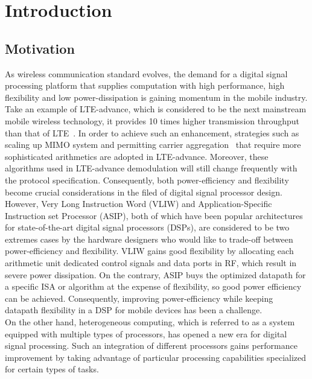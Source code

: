 \chapter{Introduction}

    \section{Motivation}
        As wireless communication standard evolves, the demand for a digital signal processing platform that supplies computation with high performance, high flexibility and low power-dissipation is gaining momentum in the mobile industry. 
        Take an example of LTE-advance, which is considered to be the next mainstream mobile wireless technology, it provides 10 times higher transmission throughput than that of LTE~\cite{lte}. 
        In order to achieve such an enhancement, strategies such as scaling up MIMO system and permitting carrier aggregation~\cite{carrier} that require more sophisticated arithmetics are adopted in LTE-advance.
        Moreover, these algorithms used in LTE-advance demodulation will still change frequently with the protocol specification.
        Consequently, both power-efficiency and flexibility become crucial considerations in the filed of digital signal processor design. 
        However, Very Long Instruction Word (VLIW) and Application-Specific Instruction set Processor (ASIP), both of which have been popular architectures for state-of-the-art digital signal processors (DSPs), are considered to be two extremes cases by the hardware designers who would like to trade-off between power-efficiency and flexibility. 
        VLIW gains good flexibility by allocating each arithmetic unit dedicated control signals and data ports in RF, which result in severe power dissipation. %
        On the contrary, ASIP buys the optimized datapath for a specific ISA or algorithm at the expense of flexibility, so good power efficiency can be achieved. 
        Consequently, improving power-efficiency while keeping datapath flexibility in a DSP for mobile devices has been a challenge.	
        \\\indent 
        On the other hand, heterogeneous computing, which is referred to as a system equipped with multiple types of processors, has opened a new era for digital signal processing. 
        Such an integration of different processors gains performance improvement by taking advantage of particular processing capabilities specialized for certain types of tasks.

